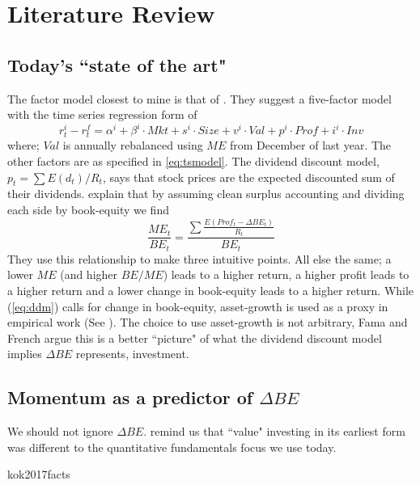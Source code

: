 
\section{Literature Review}

\subsection{Today's ``state of the art"}
The factor model closest to mine is that of \textcite{fama2016choosing}.
They suggest a five-factor model with the time series regression form of
\begin{equation}
\label{eq:tsFF2016}
r_t^i - r_t^f= \alpha^i + \beta^i \cdot Mkt + s^i \cdot Size + v^i \cdot Val + p^i \cdot Prof 
+ i^i \cdot Inv
\end{equation}
where; $Val$ is annually rebalanced using $ME$ from December of last year.
The other factors are as specified in \ref{eq:tsmodel}.
The dividend discount model, $p_t = \sum E(d_t)/R_t$, says that stock prices are the expected 
discounted sum of their dividends.
\textcite{fama2006profitability} explain that by assuming clean surplus accounting and 
dividing each side by book-equity we find
\begin{equation}
\label{eq:ddm}
\frac{ME_t}{BE_t} = \frac{\sum \frac{E(Prof_t-\Delta BE_t)}{R_t}}{BE_t}
\end{equation}
They use this relationship to make three intuitive points.
All else the same;
a lower $ME$ (and higher $BE/ME$) leads to a higher return,
a higher profit leads to a higher return and
a lower change in book-equity leads to a higher return.
While (\ref{eq:ddm}) calls for change in book-equity, asset-growth is used as a proxy in 
empirical work (See \textcite{fama2015five, fama2016choosing, fama2017international}).
The choice to use asset-growth is not arbitrary, Fama and French argue this is a better 
``picture" of what the dividend discount model implies $\Delta BE$ represents, 
investment.

\subsection{Momentum as a predictor of $\Delta BE$}
We should not ignore $\Delta BE$.
\textcite{kok2017facts} remind us that ``value" investing in its earliest form was different 
to the quantitative fundamentals focus we use today.

{kok2017facts}

